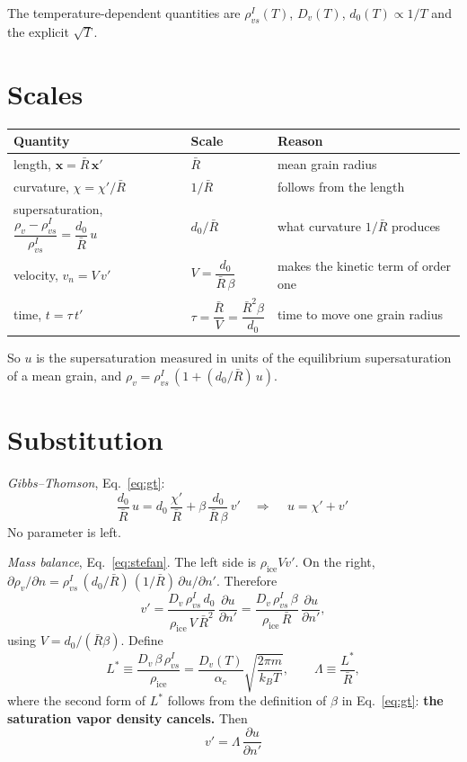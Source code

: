 \documentclass[11pt]{article}
\begin{document}
The temperature-dependent quantities are $\rho_{vs}^{I}(T)$, $D_v(T)$,
$d_0(T) \propto 1/T$ and the explicit $\sqrt T$.

\section{Scales}

\begin{center}\begin{tabular}{lll}\toprule
Quantity & Scale & Reason\\\midrule
length, $\mathbf x = \bar R\,\mathbf x'$ & $\bar R$ & mean grain radius\\
curvature, $\chi = \chi'/\bar R$ & $1/\bar R$ & follows from the length\\
supersaturation, $\dfrac{\rho_v - \rho_{vs}^{I}}{\rho_{vs}^{I}} = \dfrac{d_0}{\bar R}\,u$ & $d_0/\bar R$ & what curvature $1/\bar R$ produces\\[1.2ex]
velocity, $v_n = V\,v'$ & $V = \dfrac{d_0}{\bar R\,\beta}$ & makes the kinetic term of order one\\[1.2ex]
time, $t = \tau\,t'$ & $\tau = \dfrac{\bar R}{V} = \dfrac{\bar R^{2}\beta}{d_0}$ & time to move one grain radius\\\bottomrule
\end{tabular}\end{center}

So $u$ is the supersaturation measured in units of the equilibrium
supersaturation of a mean grain, and $\rho_v = \rho_{vs}^{I}\,(1 + (d_0/\bar R)\,u)$.

\section{Substitution}

\emph{Gibbs--Thomson}, Eq.~\eqref{eq:gt}:
\[
\frac{d_0}{\bar R}\,u = d_0\,\frac{\chi'}{\bar R} + \beta\,\frac{d_0}{\bar R\,\beta}\,v'
\quad\Longrightarrow\quad
\boxed{\,u = \chi' + v'\,}
\]
No parameter is left.

\emph{Mass balance}, Eq.~\eqref{eq:stefan}. The left side is
$\rho_{\mathrm{ice}} V v'$. On the right, $\partial\rho_v/\partial n =
\rho_{vs}^{I}\,(d_0/\bar R)\,(1/\bar R)\,\partial u/\partial n'$. Therefore
\[
v' = \frac{D_v\,\rho_{vs}^{I}\,d_0}{\rho_{\mathrm{ice}}\,V\,\bar R^{2}}\,\frac{\partial u}{\partial n'}
   = \frac{D_v\,\rho_{vs}^{I}\,\beta}{\rho_{\mathrm{ice}}\,\bar R}\,\frac{\partial u}{\partial n'} ,
\]
using $V = d_0/(\bar R\beta)$. Define
\begin{equation}
L^{*} \equiv \frac{D_v\,\beta\,\rho_{vs}^{I}}{\rho_{\mathrm{ice}}}
       = \frac{D_v(T)}{\alpha_c}\sqrt{\frac{2\pi m}{k_B T}} ,
\qquad
\Lambda \equiv \frac{L^{*}}{\bar R} ,
\label{eq:Lstar}
\end{equation}
where the second form of $L^{*}$ follows from the definition of $\beta$ in
Eq.~\eqref{eq:gt}: \textbf{the saturation vapor density cancels.} Then
\[
\boxed{\,v' = \Lambda\,\frac{\partial u}{\partial n'}\,}
\]
\end{document}
